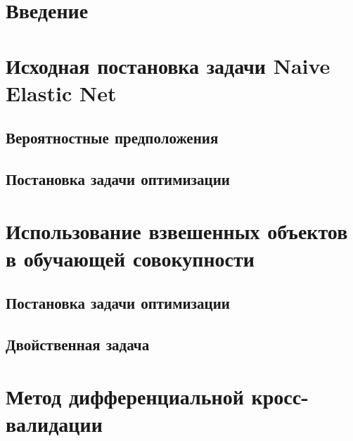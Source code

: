 \documentclass[12pt]{article}
\begin{document}
	
	\newpage \tableofcontents
	\newpage 
	\newpage \section{Введение} 

	\section{Исходная постановка задачи Naive Elastic Net}
		\subsection{Вероятностные предположения}	
		\subsection{Постановка задачи оптимизации} 	
	\section{Использование взвешенных объектов в обучающей совокупности}
		\subsection{Постановка задачи оптимизации} 	
		\subsection{Двойственная задача}			
	\section{Метод дифференциальной кросс-валидации}
		
		
		
\end{document}
